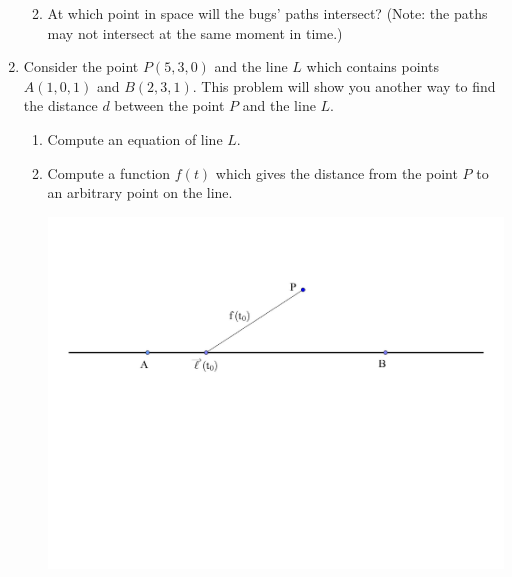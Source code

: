 \documentclass[12pt]{article}
\newif\ifans
\begin{document}
\begin{enumerate}
\begin{enumerate}
\ifans{\fbox{\parbox{1\linewidth}{Bug 1's initial position is $(x,y,z)=(1,3,5)$ and Bug 2's initial position is $(x,y,z)=(0,11,4)$.  The distance between these two points is $\sqrt{66}$}}} \fi

\item At which point in space will the bugs' paths intersect?  (Note: the paths may not intersect at the same moment in time.)

\ifans{\fbox{The paths intersect at the point $(x,y,z)=(3,8,7)$}} \fi

\end{enumerate}

\item Consider the point $P(5,3,0)$ and the line $L$ which contains points $A(1,0,1)$ and $B(2,3,1)$. This problem will show you another way to find the distance $d$ between the point $P$ and the line $L$.

\begin{enumerate}

\item Compute an equation of line $L$.

\ifans{\fbox{$\overrightarrow{\ell} (t) = \langle 1+t, 3t,1 \rangle$}} \fi

\item Compute a function $f(t)$ which gives the distance from the point $P$ to an arbitrary point on the line.  

\begin{center}
\includegraphics[scale=0.5]{distance.pdf}
\end{center}


\end{enumerate}
\end{enumerate}
\end{document}
